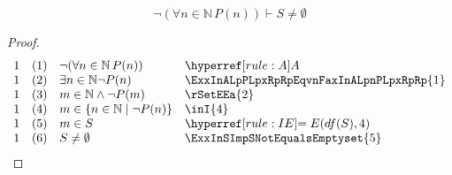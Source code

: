 \documentclass[main.tex]{subfiles}
\begin{document}
\label{PLpZeroRpwFanInNaturalLpPLpnRpToPLpnPlusOneRpRpImpFanInNaturalPLpnRpLoooo}
\begin{lemma}[4]
\[\neg (\forall n \in \mathbb{N} \, P(n))\vdash S\neq\emptyset\]
\end{lemma}
\begin{proof}
	\[
	\begin{array}{llll}
		1 &  (1) & \neg (\forall n \in \mathbb{N} \, P(n)) & \rA \\
		1 &  (2) & \exists n \in \mathbb{N} \neg P(n) & \ExxInALpPLpxRpRpEqvnFaxInALpnPLpxRpRp{1} \\
		1 &  (3) & m\in\mathbb{N}\land \neg P(m) & \rSetEEa{2} \\
		1 &  (4) & m\in \{n\in\mathbb{N}\mid \neg P(n)\} & \inI{4} \\
		1 &  (5) & m\in S & \rIE{df(S),4} \\
		1 &  (6) & S\neq\emptyset & \ExxInSImpSNotEqualsEmptyset{5} \\	
	\end{array}
	\]
\end{proof}
\end{document}

